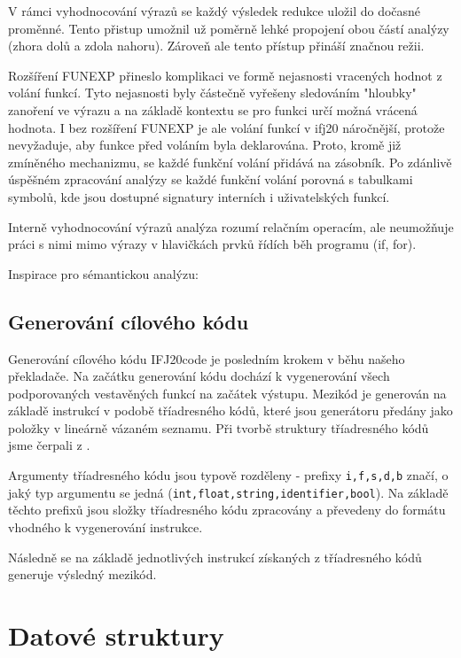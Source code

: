 \documentclass[12pt]{article}
\begin{document}
        V rámci vyhodnocování výrazů se každý výsledek redukce uložil do dočasné proměnné. Tento přistup umožnil už
        poměrně lehké propojení obou částí analýzy (zhora dolů a zdola nahoru). Zároveň ale tento přístup přináší značnou režii.

        Rozšíření FUNEXP přineslo komplikaci ve formě nejasnosti vracených hodnot z volání funkcí. Tyto nejasnosti
        byly částečně vyřešeny sledováním "hloubky" \break zanoření ve výrazu a na základě kontextu se pro funkci určí možná vrácená hodnota. I bez rozšíření FUNEXP je ale volání funkcí v ifj20 náročnější, protože nevyžaduje, aby
        funkce před voláním byla deklarována. Proto, kromě již zmí\-něného mechanizmu, se každé funkční volání přidává
        na zásobník. Po zdánlivě úspěšném zpracování analýzy se každé funkční volání porovná s tabulkami symbolů, kde
        jsou dostupné signatury interních i uživatelských funkcí.

        Interně vyhodnocování výrazů analýza rozumí relačním operacím, ale neu\-možňuje práci s nimi mimo výrazy v
        hlavičkách prvků řídích běh programu (if, for).

        Inspirace pro sémantickou analýzu: \cite{DragonBookSem}

    
    
    \newpage
    \subsection{Generování cílového kódu}
        Generování cílového kódu IFJ20code je posledním krokem v běhu našeho překladače. Na začátku generování kódu dochází k vygenerování všech podporovaných vestavěných funkcí na začátek výstupu. Mezikód je generován na základě instrukcí v podobě tříadresného kódů, které jsou generátoru předány jako položky v lineárně vázaném seznamu. Při tvorbě struktury tříadresného kódů jsme čerpali z \cite{DragonBook}. 
        
        Argumenty tříadresného kódu jsou typově rozděleny - prefixy \verb!i,f,s,d,!\texttt{b} značí, o jaký typ argumentu se jedná (\verb!int,float,string,!\texttt{identifier,}\newline \texttt{bool}).
        Na základě těchto prefixů jsou složky tříadresného kódu zpracovány a převedeny do formátu vhodného k vygenerování instrukce.
        
        Následně se na základě jednotlivých instrukcí zí\-skaných z tříadresného kódů generuje výsledný mezikód.
    \newpage
    \section{Datové struktury}
\end{document}
